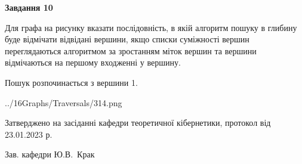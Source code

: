 \documentclass[12pt, ukrainian]{article}
\begin{document}
{\begin {large}
{\begin {center}\textbf{Завдання 10}\end {center}}\par
Для графа на рисунку вказати послідовність, в якій алгоритм пошуку в глибину буде відмічати відвідані вершини, якщо списки суміжності вершин переглядаються алгоритмом за зростанням міток вершин та вершини відмічаються на першому вход\-женні у вершину.\par
Пошук розпочинається з вершини 1.\par

\begin{center}
	{../16Graphs/Traversals/314.png}
\end{center}\par
\newpage


\end {large}
}
{\smallskip \begin {small} Затверджено на засіданні кафедри теоретичної кібернетики, протокол  від   23.01.2023 р.\par\smallskip\smallskip
{\parbox {6.5 cm}{Зав. кафедри \dotfill Ю.В.~Крак}} \end{small}}
\end{document}
